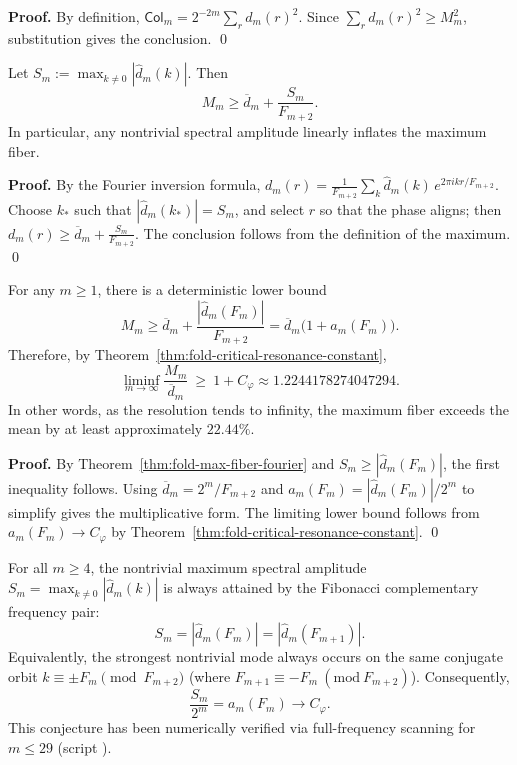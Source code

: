 \textbf{Proof.}
By definition,
\(
\mathsf{Col}_m=2^{-2m}\sum_r d_m(r)^2
\).
Since $\sum_r d_m(r)^2\ge M_m^2$, substitution gives the conclusion. \qed

\begin{theorem}
\label{thm:fold-max-fiber-fourier}
Let
\(
S_m:=\max_{k\ne 0}|\widehat d_m(k)|
\).
Then
\[
M_m\ge \overline d_m+\frac{S_m}{F_{m+2}}.
\]
In particular, any nontrivial spectral amplitude linearly inflates the maximum fiber.
\end{theorem}

\textbf{Proof.}
By the Fourier inversion formula,
\(
d_m(r)=\frac{1}{F_{m+2}}\sum_k \widehat d_m(k)\,e^{2\pi i kr/F_{m+2}}
\).
Choose $k_*$ such that $|\widehat d_m(k_*)|=S_m$, and select $r$ so that the phase aligns; then
\(
d_m(r)\ge \overline d_m+\frac{S_m}{F_{m+2}}
\).
The conclusion follows from the definition of the maximum. \qed

\begin{corollary}\label{cor:fold-max-fiber-constant-bias}
For any \(m\ge 1\), there is a deterministic lower bound
\[
M_m\ge \overline d_m+\frac{|\widehat d_m(F_m)|}{F_{m+2}}
=\overline d_m\bigl(1+a_m(F_m)\bigr).
\]
Therefore, by Theorem~\ref{thm:fold-critical-resonance-constant},
\[
\liminf_{m\to\infty}\frac{M_m}{\overline d_m}\ \ge\ 1+C_\varphi
\approx 1.2244178274047294.
\]
In other words, as the resolution tends to infinity, the maximum fiber exceeds the mean by at least approximately \(22.44\%\).
\end{corollary}

\textbf{Proof.}
By Theorem~\ref{thm:fold-max-fiber-fourier} and \(S_m\ge |\widehat d_m(F_m)|\), the first inequality follows.
Using \(\overline d_m=2^m/F_{m+2}\) and \(a_m(F_m)=|\widehat d_m(F_m)|/2^m\) to simplify gives the multiplicative form.
The limiting lower bound follows from \(a_m(F_m)\to C_\varphi\) by Theorem~\ref{thm:fold-critical-resonance-constant}. \qed

\begin{conjecture}\label{conj:fold-fourier-fibonacci-extremizer}
For all \(m\ge 4\), the nontrivial maximum spectral amplitude
\(
S_m=\max_{k\ne 0}|\widehat d_m(k)|
\)
is always attained by the Fibonacci complementary frequency pair:
\[
S_m=|\widehat d_m(F_m)|=|\widehat d_m(F_{m+1})|.
\]
Equivalently, the strongest nontrivial mode always occurs on the same conjugate orbit
\(
k\equiv\pm F_m\pmod{F_{m+2}}
\)
(where \(F_{m+1}\equiv -F_m\ (\mathrm{mod}\ F_{m+2})\)).
Consequently,
\[
\frac{S_m}{2^m}=a_m(F_m)\longrightarrow C_\varphi.
\]
This conjecture has been numerically verified via full-frequency scanning for \(m\le 29\) (script ).
\end{conjecture}

